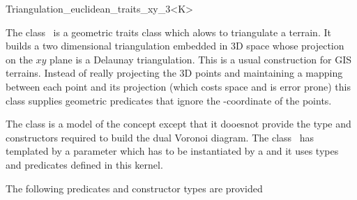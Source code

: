

\begin{ccRefClass}{Triangulation_euclidean_traits_xy_3<K>}  %

\ccDefinition
  
The class \ccRefName\ is a geometric traits class which alows to
triangulate
a terrain. It builds 
a two dimensional triangulation  embedded in 3D space
whose projection 
on the $xy$ plane  is a Delaunay triangulation.
This is a usual construction for GIS terrains.
Instead of really projecting the 3D points and
maintaining a mapping between each point and its projection
 (which costs space and is error prone)
this class supplies geometric predicates that ignore the
-coordinate of the points.

The class is a model of the concept  
except that it dooesnot provide the type and constructors
required to build the dual Voronoi diagram.
The class \ccRefName\ has  templated by a parameter which has to
be instantiated by a  and it uses types 
and predicates defined in this  kernel.


\ccTypes
{}
\ccGlue
{}
\ccGlue
{}

The following predicates and constructor types are provided


\end{ccRefClass}
